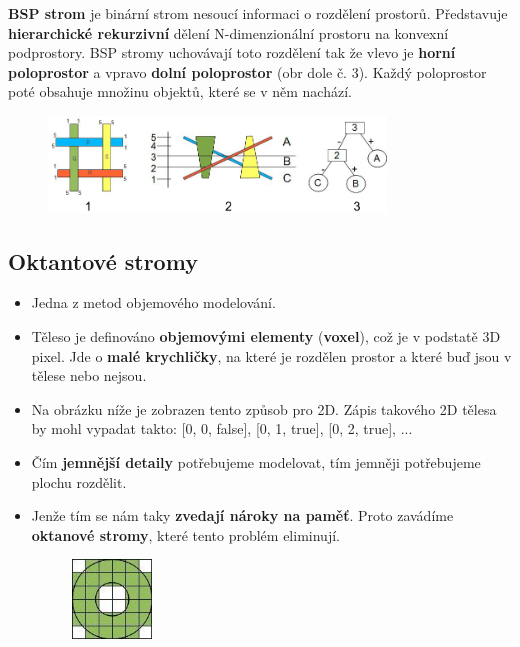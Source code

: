 \textbf{BSP strom} je binární strom nesoucí informaci o rozdělení prostorů. Představuje \textbf{hierarchické rekurzivní} dělení N-dimenzionální prostoru na konvexní podprostory. BSP stromy uchovávají toto rozdělení tak že vlevo je \textbf{horní poloprostor} a vpravo \textbf{dolní poloprostor} (obr dole č. 3). Každý poloprostor poté obsahuje množinu objektů, které se v něm nachází.

\begin{figure}[H]
	\centering
	\includegraphics[width=0.8\textwidth]{assets/4_Bsp}
\end{figure}
 
 \subsection{Oktantové stromy}
 \begin{itemize}
 	\item Jedna z metod objemového modelování.
 	\item Těleso je definováno \textbf{objemovými elementy} (\textbf{voxel}), což je v podstatě 3D pixel. Jde o \textbf{malé krychličky}, na které je rozdělen prostor a které buď jsou v tělese nebo nejsou.
 	\item Na obrázku níže je zobrazen tento způsob pro 2D. Zápis takového 2D tělesa by mohl vypadat takto: [0, 0, false], [0, 1, true], [0, 2, true], ...
	\item Čím \textbf{jemnější detaily} potřebujeme modelovat, tím jemněji potřebujeme plochu rozdělit.
	\item Jenže tím se nám taky \textbf{zvedají nároky na paměť}. Proto zavádíme \textbf{oktanové stromy}, které tento problém eliminují.
		\begin{figure}[H]
		\centering
		\includegraphics[width=0.2\textwidth]{assets/4_octan}
		\end{figure}
\end{itemize}

